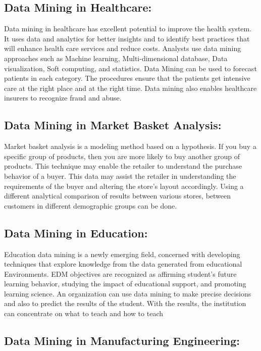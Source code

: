 \documentclass[a4paper,10pt]{article}
\begin{document}
\subsection{Data Mining in Healthcare:}

Data mining in healthcare has excellent potential to improve the health system. It uses data and analytics for better insights and to identify best practices that will enhance health care services and reduce costs. Analysts use data mining approaches such as Machine learning, Multi-dimensional database, Data visualization, Soft computing, and statistics. Data Mining can be used to forecast patients in each category. The procedures ensure that the patients get intensive care at the right place and at the right time. Data mining also enables healthcare insurers to recognize fraud and abuse.
\subsection{Data Mining in Market Basket Analysis:}

Market basket analysis is a modeling method based on a hypothesis. If you buy a specific group of products, then you are more likely to buy another group of products. This technique may enable the retailer to understand the purchase behavior of a buyer. This data may assist the retailer in understanding the requirements of the buyer and altering the store's layout accordingly. Using a different analytical comparison of results between various stores, between customers in different demographic groups can be done.

\subsection{Data Mining in Education:}

Education data mining is a newly emerging field, concerned with developing techniques that explore knowledge from the data generated from educational Environments. EDM objectives are recognized as affirming student's future learning behavior, studying the impact of educational support, and promoting learning science. An organization can use data mining to make precise decisions and also to predict the results of the student. With the results, the institution can concentrate on what to teach and how to teach

\subsection{Data Mining in Manufacturing Engineering:}
\end{document}
